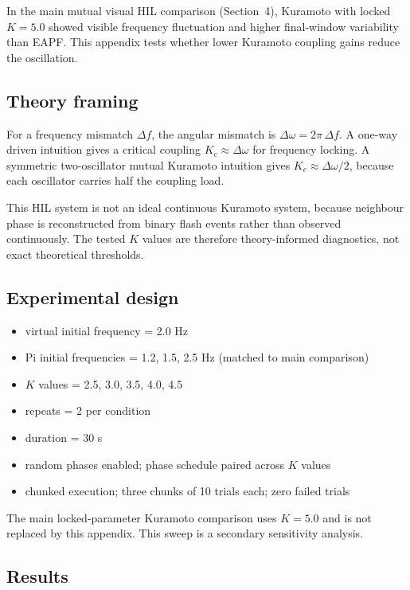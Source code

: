 \documentclass[11pt,a4paper]{article}
\begin{document}
In the main mutual visual HIL comparison (Section~4), Kuramoto with locked
$K=5.0$ showed visible frequency fluctuation and higher final-window
variability than EAPF. This appendix tests whether lower Kuramoto coupling
gains reduce the oscillation.

\subsection{Theory framing}

For a frequency mismatch $\Delta f$, the angular mismatch is $\Delta\omega =
2\pi\,\Delta f$. A one-way driven intuition gives a critical coupling
$K_c \approx \Delta\omega$ for frequency locking. A symmetric two-oscillator
mutual Kuramoto intuition gives $K_c \approx \Delta\omega / 2$, because each
oscillator carries half the coupling load.

This HIL system is not an ideal continuous Kuramoto system, because neighbour
phase is reconstructed from binary flash events rather than observed
continuously. The tested $K$ values are therefore theory-informed diagnostics,
not exact theoretical thresholds.

\subsection{Experimental design}

\begin{itemize}
  \item virtual initial frequency = 2.0 Hz
  \item Pi initial frequencies = 1.2, 1.5, 2.5 Hz (matched to main comparison)
  \item $K$ values = 2.5, 3.0, 3.5, 4.0, 4.5
  \item repeats = 2 per condition
  \item duration = 30 s
  \item random phases enabled; phase schedule paired across $K$ values
  \item chunked execution; three chunks of 10 trials each; zero failed trials
\end{itemize}

The main locked-parameter Kuramoto comparison uses $K=5.0$ and is not replaced
by this appendix. This sweep is a secondary sensitivity analysis.

\subsection{Results}
\end{document}
